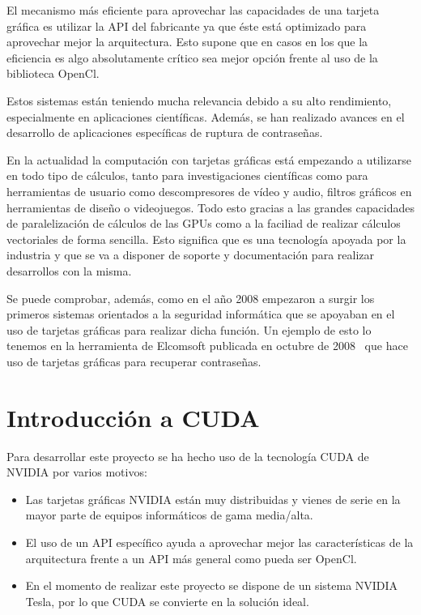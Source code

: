 El mecanismo más eficiente para aprovechar las capacidades de una tarjeta gráfica es utilizar la API del fabricante ya que éste está optimizado para aprovechar mejor la arquitectura. Esto supone que en casos en los que la eficiencia es algo absolutamente crítico sea mejor opción frente al uso de la biblioteca OpenCl.

Estos sistemas están teniendo mucha relevancia debido a su alto rendimiento, especialmente en aplicaciones científicas. Además, se han realizado avances en el desarrollo de aplicaciones específicas de ruptura de contraseñas.

En la actualidad la computación con tarjetas gráficas está empezando a utilizarse en todo tipo de cálculos, tanto para investigaciones científicas  como para herramientas de usuario como descompresores de vídeo y audio, filtros gráficos en herramientas de diseño o videojuegos. Todo esto gracias a las grandes capacidades de paralelización de cálculos de las GPUs como a la faciliad de realizar cálculos vectoriales de forma sencilla. Esto significa que es una tecnología apoyada por la industria y que se va a disponer de soporte y documentación para realizar desarrollos con la misma.

Se puede comprobar, además, como en el año 2008 empezaron a surgir los primeros sistemas orientados a la seguridad informática que se apoyaban en el uso de tarjetas gráficas para realizar dicha función. Un ejemplo de esto lo tenemos en la herramienta de Elcomsoft publicada en octubre de 2008~\cite{website:elcomsoft_press} que hace uso de tarjetas gráficas para recuperar contraseñas.

\section{Introducción a CUDA}

Para desarrollar este proyecto se ha hecho uso de la tecnología CUDA de NVIDIA por varios motivos:
\begin{itemize}
	\item Las tarjetas gráficas NVIDIA están muy distribuidas y vienes de serie en la mayor parte de equipos informáticos de gama media/alta.
	\item El uso de un API específico ayuda a aprovechar mejor las características de la arquitectura frente a un API más general como pueda ser OpenCl.
	\item En el momento de realizar este proyecto se dispone de un sistema NVIDIA Tesla, por lo que CUDA se convierte en la solución ideal.
\end{itemize}

